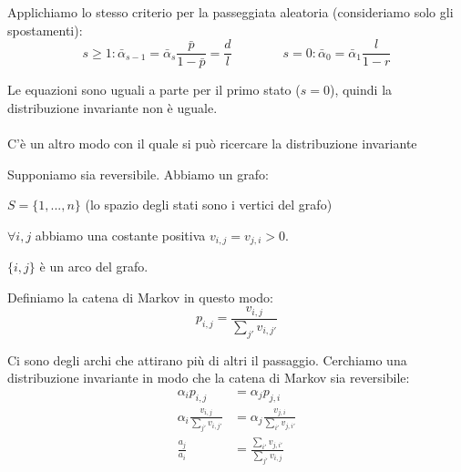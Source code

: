 \documentclass[a4paper,12pt]{book}
\newcommand\ddfrac[2]{\frac{\displaystyle #1}{\displaystyle #2}}
\begin{document}
Applichiamo lo stesso criterio per la passeggiata aleatoria (consideriamo solo gli spostamenti):
$$ s \ge 1: 
	\bar{\alpha}_{s-1} = \bar{\alpha}_s \ddfrac{\bar{p}}{1-\bar{p}} = \ddfrac{d}{l}
	\qquad \qquad s = 0: 
	\bar{\alpha}_{0} = \bar{\alpha}_{1} \ddfrac{l}{1-r}
$$

Le equazioni sono uguali a parte per il primo stato ($ s=0 $), quindi la distribuzione invariante non è uguale. 
\\
\\
C'è un altro modo con il quale si può ricercare la distribuzione invariante %

Supponiamo sia reversibile. %
Abbiamo un grafo:
\begin{multicols}{2}
	
	
	$ S = \{1,...,n\} $ (lo spazio degli stati sono i vertici del grafo)
	
	$ \forall i,j $ abbiamo una costante positiva $ v_{i,j} = v_{j,i} > 0 $.
	
	$ \{i,j\} $ è un arco del grafo.
\end{multicols}

Definiamo la catena di Markov in questo modo:
$$ p_{i,j} = \ddfrac{v_{i,j}}{\sum_{j'}v_{i,j'}} $$

Ci sono degli archi che attirano più di altri il passaggio. Cerchiamo una distribuzione invariante in modo che la catena di Markov sia reversibile:
\begin{align*}
	\alpha_{i}p_{i,j} & = \alpha_{j}p_{j,i} \\
	\alpha_{i}\ddfrac{v_{i,j}}{\sum_{j'}v_{i,j'}} & = 	\alpha_{j}\ddfrac{v_{j,i}}{\sum_{i'}v_{j,i'}} \\
	\ddfrac{a_j}{a_i} & = \frac{\sum_{i'}v_{j,i'}}{\sum_{j'}v_{i,j}}
\end{align*}
\end{document}

